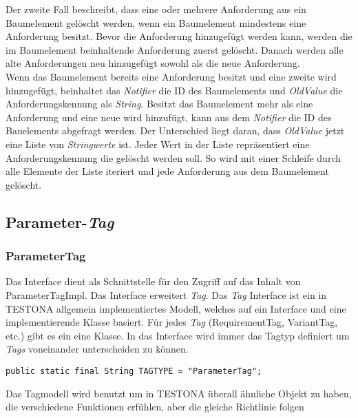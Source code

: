 Der zweite Fall beschreibt, dass eine oder mehrere Anforderung aus ein Baumelement gelöscht werden, wenn ein Baumelement mindestens eine Anforderung besitzt. Bevor die Anforderung hinzugefügt werden kann, werden die im Baumelement beinhaltende Anforderung zuerst gelöscht. Danach werden alle alte Anforderungen neu hinzugefügt sowohl als die neue Anforderung.\\


Wenn das Baumelement bereits eine Anforderung besitzt und eine zweite wird hinzugefügt, beinhaltet das \textit{Notifier} die ID des Baumelements und \textit{OldValue} die Anforderungskennung als \textit{String}. Besitzt das Baumelement mehr als eine Anforderung und eine neue wird hinzufügt, kann aus dem \textit{Notifier} die ID des Bauelements abgefragt werden. Der Unterschied liegt daran, dass \textit{OldValue} jetzt eine Liste von \textit{Stringwerte} ist. Jeder Wert in der Liste repräsentiert eine Anforderungskennung die gelöscht werden soll. So wird mit einer Schleife durch alle Elemente der Liste iteriert und jede Anforderung aus dem Baumelement gelöscht.\\



\subsection{Parameter-\textit{Tag}}\label{sub.ParameterTag}
\subsubsection{ParameterTag}
Das Interface dient als Schnittstelle für den Zugriff auf das Inhalt von ParameterTagImpl. Das Interface erweitert \textit{Tag}. Das \textit{Tag} Interface ist ein in TESTONA allgemein implementiertes Modell, welches auf ein Interface und eine implementierende Klasse basiert. Für jedes \textit{Tag} (RequirementTag, VariantTag, etc.) gibt es ein eine Klasse. In das Interface wird immer das Tagtyp definiert um \textit{Tags} voneinander unterscheiden zu können.

\begin{lstlisting}[caption={ParameterTag Interface}, captionpos=b]
public static final String TAGTYPE = "ParameterTag";
\end{lstlisting}

Das Tagmodell wird benutzt um in TESTONA überall ähnliche Objekt zu haben, die verschiedene Funktionen erfühlen, aber die gleiche Richtlinie folgen

